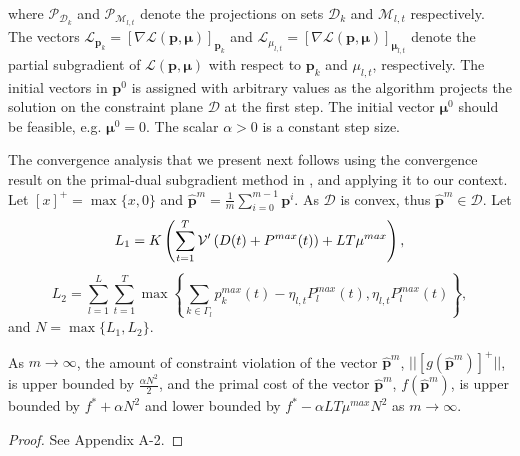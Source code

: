 \documentclass[12pt,draftcls,onecolumn]{IEEEtran}
\begin{document}
where $\mathcal{P}_{\mathcal{D}_k}$ and $\mathcal{P}_{\mathcal{M}_{l,t}}$ denote the projections on sets $\mathcal{D}_k$ and $\mathcal{M}_{l,t}$ respectively. The vectors $\mathcal{L}_{\mathbf{p}_k}=[\nabla \mathcal{L}(\mathbf{p}, \mathbf{\mu})]_{\mathbf{p}_k}$ and $\mathcal{L}_{\mu_{l,t}}=[\nabla \mathcal{L}(\mathbf{p}, \mathbf{\mu})]_{\mathbf{\mu}_{l,t}}$ denote the partial subgradient of $\mathcal{L}(\mathbf{p}, \mathbf{\mu})$ with respect to $\mathbf{p}_k$ and $\mu_{l,t}$, respectively. The initial vectors in $\mathbf{p}^0$  is assigned with arbitrary values as the algorithm projects the solution on the constraint plane $\mathcal{D}$ at the first step. The initial vector $\mathbf{\mu}^0$ should be feasible, e.g. $\mathbf{\mu}^{0}=0$. The scalar $\alpha > 0$ is a constant step size.

The convergence analysis that we present next follows using the convergence result on the primal-dual subgradient method in \cite{NO09}, and applying it to our context. Let $[x]^+ = \max\{x, 0\}$ and $\hat{\mathbf{p}}^m=\frac{1}{m}\sum_{i=0}^{m-1}\mathbf{p}^{i}$. As $\mathcal{D}$ is convex, thus $\hat{\mathbf{p}}^{m}\in\mathcal{D}$. Let
\begin{equation}
L_1=K\left (\sum_{t=1}^{T}\mathcal{V}\rq{}\left(D(t)+P^{max}(t)\right)+LT\mu^{max}\right ), \nonumber
\end{equation}
\begin{equation}
L_2=\sum_{l=1}^{L}\sum_{t=1}^{T}\max \left \{ \sum_{k\in \Gamma_l}p_k^{max}(t)-\eta_{l,t} P_l^{max}(t), \eta_{l,t} P_l^{max}(t)\right \}, \nonumber
\end{equation}
and $N = \max\{L_1, L_2\}$.
\begin{Thm}
As $m \rightarrow \infty$, the amount of constraint violation of the vector $\hat{\mathbf{p}}^m$, $||[g(\hat{\mathbf{p}}^{m})]^{+}||$, is upper bounded by $\frac{\alpha N^2}{2}$, and the primal cost of the vector $\hat{\mathbf{p}}^{m}$, $f(\hat{\mathbf{p}}^{m})$, is upper bounded by $f^*+\alpha N^2$ and lower bounded by $f^*-\alpha LT\mu^{max}N^2$ as $m \rightarrow \infty$.
\label{primaldual}
\end{Thm}
\begin{proof}
See Appendix A-2.
\end{proof}
\end{document}
